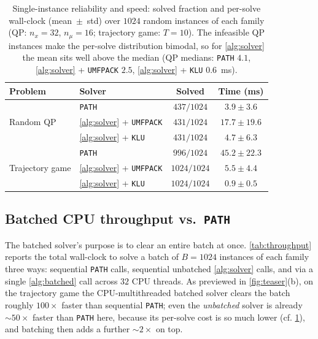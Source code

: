 \documentclass[conference]{IEEEtran}
\begin{document}
\begin{table}[t]
  \centering
  \begin{tabular}{llcc}
    \toprule
    Problem & Solver & Solved & Time (ms) \\
    \midrule
    \multirow{3}{4em}{Random QP}
      & \texttt{PATH}               & $437/1024$ & $3.9 \pm 3.6$ \\
      & \cref{alg:solver} + \texttt{UMFPACK} & $431/1024$ & $17.7 \pm 19.6$ \\
      & \cref{alg:solver} + \texttt{KLU}     & $431/1024$ & $4.7 \pm 6.3$ \\
    \midrule
    \multirow{3}{4em}{Trajectory game}
      & \texttt{PATH}               & $996/1024$ & $45.2 \pm 22.3$ \\
      & \cref{alg:solver} + \texttt{UMFPACK} & $1024/1024$ & $5.5 \pm 4.4$ \\
      & \cref{alg:solver} + \texttt{KLU}     & $1024/1024$ & $0.9 \pm 0.5$ \\
    \bottomrule
  \end{tabular}
  \caption{Single-instance reliability and speed: solved fraction and per-solve wall-clock
    (mean~$\pm$~std) over $1024$ random instances of each family (QP: $n_x = 32$,
    $n_\mu = 16$; trajectory game: $T = 10$). The infeasible QP instances make the
    per-solve distribution bimodal, so for \cref{alg:solver} the mean sits well above the median (QP medians:
    \texttt{PATH} $4.1$, \cref{alg:solver} + \texttt{UMFPACK} $2.5$,
    \cref{alg:solver} + \texttt{KLU} $0.6$~ms).}
  \label{tab:single}
\end{table}

\subsection{Batched CPU throughput vs.\ \texttt{PATH}}
\label{sec:exp:throughput}

The batched solver's purpose is to clear an entire batch at once. \cref{tab:throughput}
reports the total wall-clock to solve a batch of $B = 1024$ instances of each family
three ways: sequential \texttt{PATH} calls, sequential unbatched \cref{alg:solver}
calls, and via a single \cref{alg:batched} call across $32$ CPU threads.
As previewed in \cref{fig:teaser}(b), on the trajectory game the CPU-multithreaded batched
solver clears the batch roughly $100\times$ faster than sequential \texttt{PATH}; even the
\emph{unbatched} solver is already $\sim\!50\times$ faster than \texttt{PATH} here, because
its per-solve cost is so much lower (cf. \cref{tab:single}), and batching then adds a further
$\sim\!2\times$ on top.
\end{document}
